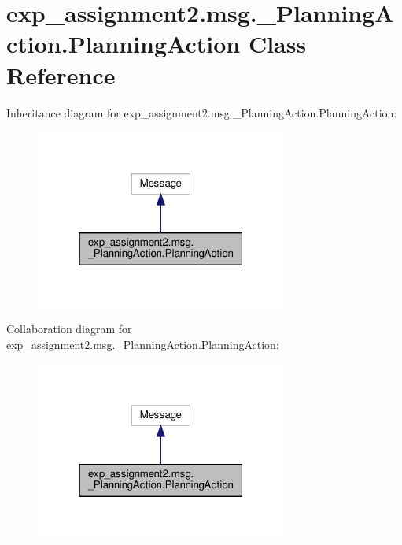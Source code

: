 \hypertarget{classexp__assignment2_1_1msg_1_1__PlanningAction_1_1PlanningAction}{}\section{exp\+\_\+assignment2.\+msg.\+\_\+\+Planning\+Action.\+Planning\+Action Class Reference}
\label{classexp__assignment2_1_1msg_1_1__PlanningAction_1_1PlanningAction}


Inheritance diagram for exp\+\_\+assignment2.\+msg.\+\_\+\+Planning\+Action.\+Planning\+Action\+:
\nopagebreak
\begin{figure}[H]
\begin{center}
\leavevmode
\includegraphics[width=235pt]{classexp__assignment2_1_1msg_1_1__PlanningAction_1_1PlanningAction__inherit__graph}
\end{center}
\end{figure}


Collaboration diagram for exp\+\_\+assignment2.\+msg.\+\_\+\+Planning\+Action.\+Planning\+Action\+:
\nopagebreak
\begin{figure}[H]
\begin{center}
\leavevmode
\includegraphics[width=235pt]{classexp__assignment2_1_1msg_1_1__PlanningAction_1_1PlanningAction__coll__graph}
\end{center}
\end{figure}
